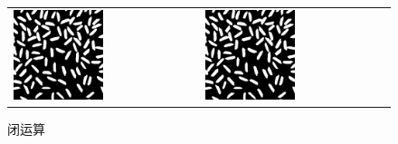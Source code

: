 \documentclass[a4paper]{ctexart}
\begin{document}
\begin{figure}[H]
    \begin{tabular}{p{}p{}}
    \centering
      \includegraphics*[width=0.5\textwidth]{fig/open.png}
      \caption{开运算}
      &
      \centering
      \includegraphics*[width=0.5\textwidth]{fig/close.png}
      \caption{闭运算}
    \end{tabular}
  \end{figure}
  \newpage
\end{document}
